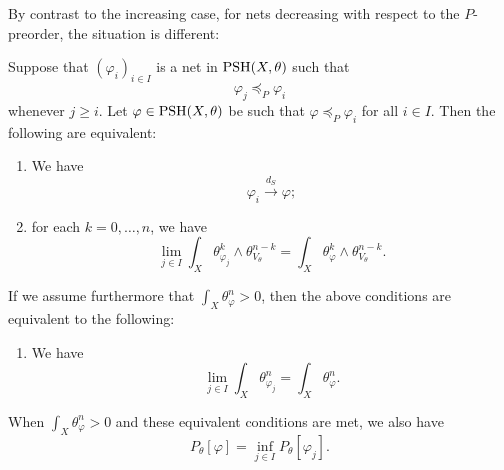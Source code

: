 By contrast to the increasing case, for nets decreasing with respect to the $P$-preorder, the situation is different:
\begin{corollary}\label{cor:decnetdS}
    Suppose that $(\varphi_i)_{i\in I}$ is a net in $\mathrm{PSH}(X,\theta)$ such that
    \[
        \varphi_j\preceq_P\varphi_i
    \]
    whenever $j\geq i$. Let $\varphi\in\mathrm{PSH}(X,\theta)$ be such that $\varphi\preceq_P\varphi_i$ for all $i\in I$. Then the following are equivalent:
    \begin{enumerate}
        \item\label{itm:cor:decnetdS:1} We have
            \[
                \varphi_i\xrightarrow{d_S} \varphi;
            \]
        \item\label{itm:cor:decnetdS:2} for each $k=0,\ldots,n$, we have
            \begin{equation}\label{eq:mixedmasslim}
                \lim_{j\in I}\int_X \theta_{\varphi_j}^k\wedge \theta_{V_{\theta}}^{n-k} =  \int_X \theta_{\varphi}^k\wedge \theta_{V_{\theta}}^{n-k}.
            \end{equation}
    \end{enumerate}
    If we assume furthermore that $\int_X \theta_{\varphi}^n>0$, then the above conditions are equivalent to the following:
    \begin{enumerate}[resume]
        \item\label{itm:cor:decnetdS:3} We have
            \[
                \lim_{j\in I}\int_X \theta_{\varphi_j}^n=\int_X \theta_{\varphi}^n.
            \]
    \end{enumerate}
    When $\int_X \theta_{\varphi}^n>0$ and these equivalent conditions are met, we also have
    \begin{equation}\label{eq:Pcontdecseq}
        P_{\theta}[\varphi]=\inf_{j\in I}P_{\theta}[\varphi_j].
    \end{equation}
\end{corollary}
